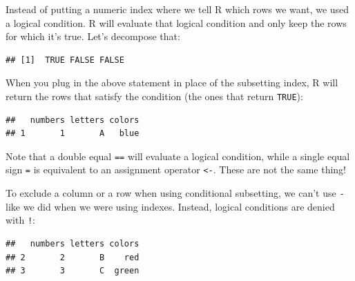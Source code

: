 \documentclass[
]{book}
\newenvironment{Shaded}{\begin{snugshade}}{\end{snugshade}}
\newcommand{\NormalTok}[1]{#1}
\newcommand{\SpecialCharTok}[1]{\textcolor[rgb]{0.81,0.36,0.00}{\textbf{#1}}}
\newcommand{\StringTok}[1]{\textcolor[rgb]{0.31,0.60,0.02}{#1}}
\begin{document}
Instead of putting a numeric index where we tell R which rows we want, we used a
logical condition. R will evaluate that logical condition and only keep the rows
for which it's true. Let's decompose that:

\begin{Shaded}
\end{Shaded}

\begin{verbatim}
## [1]  TRUE FALSE FALSE
\end{verbatim}

When you plug in the above statement in place of the subsetting index, R will
return the rows that satisfy the condition (the ones that return \texttt{TRUE}):

\begin{Shaded}
\end{Shaded}

\begin{verbatim}
##   numbers letters colors
## 1       1       A   blue
\end{verbatim}

Note that a double equal \texttt{==} will evaluate a logical condition, while a single
equal sign \texttt{=} is equivalent to an assignment operator \texttt{\textless{}-}. These are not the
same thing!

To exclude a column or a row when using conditional subsetting, we can't use \texttt{-}
like we did when we were using indexes. Instead, logical conditions are denied
with \texttt{!}:

\begin{Shaded}
\end{Shaded}

\begin{verbatim}
##   numbers letters colors
## 2       2       B    red
## 3       3       C  green
\end{verbatim}
\end{document}
